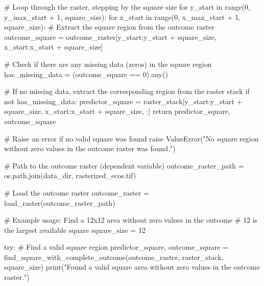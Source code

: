 \documentclass[
  letterpaper,
]{article}
\newenvironment{Shaded}{\begin{snugshade}}{\end{snugshade}}
\newcommand{\BuiltInTok}[1]{\textcolor[rgb]{0.00,0.23,0.31}{#1}}
\newcommand{\CommentTok}[1]{\textcolor[rgb]{0.37,0.37,0.37}{#1}}
\newcommand{\ControlFlowTok}[1]{\textcolor[rgb]{0.00,0.23,0.31}{#1}}
\newcommand{\DecValTok}[1]{\textcolor[rgb]{0.68,0.00,0.00}{#1}}
\newcommand{\KeywordTok}[1]{\textcolor[rgb]{0.00,0.23,0.31}{#1}}
\newcommand{\NormalTok}[1]{\textcolor[rgb]{0.00,0.23,0.31}{#1}}
\newcommand{\OperatorTok}[1]{\textcolor[rgb]{0.37,0.37,0.37}{#1}}
\newcommand{\PreprocessorTok}[1]{\textcolor[rgb]{0.68,0.00,0.00}{#1}}
\newcommand{\StringTok}[1]{\textcolor[rgb]{0.13,0.47,0.30}{#1}}
\begin{document}
\begin{Shaded}
\begin{Highlighting}[]
    \CommentTok{\# Loop through the raster, stepping by the square size}
    \ControlFlowTok{for}\NormalTok{ y\_start }\KeywordTok{in} \BuiltInTok{range}\NormalTok{(}\DecValTok{0}\NormalTok{, y\_max\_start }\OperatorTok{+} \DecValTok{1}\NormalTok{, square\_size):}
        \ControlFlowTok{for}\NormalTok{ x\_start }\KeywordTok{in} \BuiltInTok{range}\NormalTok{(}\DecValTok{0}\NormalTok{, x\_max\_start }\OperatorTok{+} \DecValTok{1}\NormalTok{, square\_size):}
            \CommentTok{\# Extract the square region from the outcome raster}
\NormalTok{            outcome\_square }\OperatorTok{=}\NormalTok{ outcome\_raster[y\_start:y\_start }\OperatorTok{+}\NormalTok{ square\_size, x\_start:x\_start }\OperatorTok{+}\NormalTok{ square\_size]}
            
            \CommentTok{\# Check if there are any missing data (zeros) in the square region}
\NormalTok{            has\_missing\_data }\OperatorTok{=}\NormalTok{ (outcome\_square }\OperatorTok{==} \DecValTok{0}\NormalTok{).}\BuiltInTok{any}\NormalTok{()}
            
            \CommentTok{\# If no missing data, extract the corresponding region from the raster stack}
            \ControlFlowTok{if} \KeywordTok{not}\NormalTok{ has\_missing\_data:}
\NormalTok{                predictor\_square }\OperatorTok{=}\NormalTok{ raster\_stack[y\_start:y\_start }\OperatorTok{+}\NormalTok{ square\_size, x\_start:x\_start }\OperatorTok{+}\NormalTok{ square\_size, :]}
                \ControlFlowTok{return}\NormalTok{ predictor\_square, outcome\_square}
    
    \CommentTok{\# Raise an error if no valid square was found}
    \ControlFlowTok{raise} \PreprocessorTok{ValueError}\NormalTok{(}\StringTok{"No square region without zero values in the outcome raster was found."}\NormalTok{)}

\CommentTok{\# Path to the outcome raster (dependent variable)}
\NormalTok{outcome\_raster\_path }\OperatorTok{=}\NormalTok{ os.path.join(data\_dir, }\StringTok{\textquotesingle{}rasterized\_ecos.tif\textquotesingle{}}\NormalTok{)}

\CommentTok{\# Load the outcome raster}
\NormalTok{outcome\_raster }\OperatorTok{=}\NormalTok{ load\_raster(outcome\_raster\_path)}

\CommentTok{\# Example usage: Find a 12x12 area without zero values in the outcome}
\CommentTok{\# 12 is the largest available square}
\NormalTok{square\_size }\OperatorTok{=} \DecValTok{12}

\ControlFlowTok{try}\NormalTok{:}
    \CommentTok{\# Find a valid square region}
\NormalTok{    predictor\_square, outcome\_square }\OperatorTok{=}\NormalTok{ find\_square\_with\_complete\_outcome(outcome\_raster, raster\_stack, square\_size)}
    \BuiltInTok{print}\NormalTok{(}\StringTok{"Found a valid square area without zero values in the outcome raster."}\NormalTok{)}
    

\end{Highlighting}
\end{Shaded}
\end{document}
